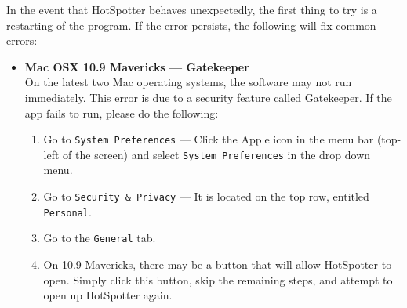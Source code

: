 \documentclass[a4paper,10pt]{article}
\begin{document}
In the event that HotSpotter behaves unexpectedly, the first thing to try is a
restarting of the program. If the error persists, the following will fix common
errors: 

\begin{itemize}


    \item \textbf{Mac OSX 10.9 Mavericks --- Gatekeeper}\\
      On the latest two Mac operating systems, the software may not run immediately. 
      This error is due to a security feature called Gatekeeper.  If the app
      fails to run, please do the following:
        \begin{enumerate}
            \item Go to {\tt System Preferences} --- Click the Apple icon in the menu bar (top-left of the screen) and select {\tt System Preferences} in the drop down menu.
            \item Go to {\tt Security \& Privacy} --- It is located on the top row, entitled {\tt Personal}.
            \item Go to the {\tt General} tab.
	  \item On 10.9 Mavericks, there may be a button that will allow HotSpotter to open.  Simply click this button, skip the remaining steps, and attempt to open up HotSpotter again.  %
%
%
%
        \end{enumerate}



\end{itemize}
\end{document}
